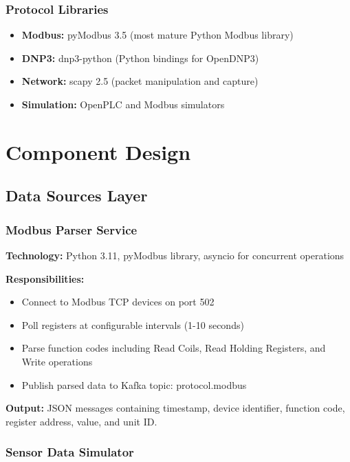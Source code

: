 \documentclass[12pt,a4paper]{article}
\begin{document}
\subsubsection{Protocol Libraries}

\begin{itemize}[leftmargin=1cm,itemsep=0pt]
    \item \textbf{Modbus:} pyModbus 3.5 (most mature Python Modbus library)
    \item \textbf{DNP3:} dnp3-python (Python bindings for OpenDNP3)
    \item \textbf{Network:} scapy 2.5 (packet manipulation and capture)
    \item \textbf{Simulation:} OpenPLC and Modbus simulators
\end{itemize}

\section{Component Design}

\subsection{Data Sources Layer}

\subsubsection{Modbus Parser Service}

\textbf{Technology:} Python 3.11, pyModbus library, asyncio for concurrent operations

\textbf{Responsibilities:}
\begin{itemize}[leftmargin=1cm,itemsep=0pt]
    \item Connect to Modbus TCP devices on port 502
    \item Poll registers at configurable intervals (1-10 seconds)
    \item Parse function codes including Read Coils, Read Holding Registers, and Write operations
    \item Publish parsed data to Kafka topic: protocol.modbus
\end{itemize}

\textbf{Output:} JSON messages containing timestamp, device identifier, function code, register address, value, and unit ID.

\subsubsection{Sensor Data Simulator}
\end{document}
